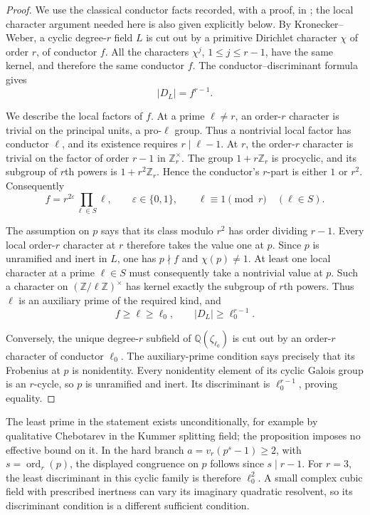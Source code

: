 \documentclass[11pt]{article}
\theoremstyle{definition}
\theoremstyle{remark}
\begin{document}
\begin{proof}
We use the classical conductor facts recorded, with a proof, in
\citet[Lemma~8.3.1]{CornelissenHokkenRingeling2026}; the local
character argument needed here is also given explicitly below.
By Kronecker--Weber, a cyclic degree-$r$ field $L$ is cut out by
a primitive Dirichlet character $\chi$ of order $r$, of conductor
$f$.  All the characters $\chi^j$, $1\le j\le r-1$, have the
same kernel, and therefore the same conductor $f$.  The
conductor--discriminant formula gives
\[
 |D_L|=f^{r-1}.
\]

We describe the local factors of $f$.  At a prime $\ell\ne r$,
an order-$r$ character is trivial on the principal units, a
pro-$\ell$ group.  Thus a nontrivial local factor has conductor
$\ell$, and its existence requires $r\mid\ell-1$.
At $r$, the order-$r$ character is trivial on the factor of
order $r-1$ in $\mathbb Z_r^\times$.  The group
$1+r\mathbb Z_r$ is procyclic, and its subgroup of $r$th powers
is $1+r^2\mathbb Z_r$.  Hence the conductor's $r$-part is either
$1$ or $r^2$.  Consequently
\[
 f=r^{2\varepsilon}\prod_{\ell\in S}\ell,
 \qquad \varepsilon\in\{0,1\},
 \qquad \ell\equiv1\pmod r\quad(\ell\in S).
\]

The assumption on $p$ says that its class modulo $r^2$ has
order dividing $r-1$.  Every local order-$r$ character at $r$
therefore takes the value one at $p$.
Since $p$ is unramified and inert in $L$, one has
$p\nmid f$ and $\chi(p)\ne1$.  At least one local character
at a prime $\ell\in S$ must consequently take a nontrivial
value at $p$.  Such a character on
$(\mathbb Z/\ell\mathbb Z)^\times$ has kernel exactly the
subgroup of $r$th powers.  Thus $\ell$ is an auxiliary prime
of the required kind, and
\[
 f\ge\ell\ge\ell_0,
 \qquad |D_L|\ge\ell_0^{r-1}.
\]

Conversely, the unique degree-$r$ subfield of
$\mathbb Q(\zeta_{\ell_0})$ is cut out by an order-$r$
character of conductor $\ell_0$.
The auxiliary-prime condition says precisely that its Frobenius
at $p$ is nonidentity.  Every nonidentity element of its cyclic
Galois group is an $r$-cycle, so $p$ is unramified and inert.
Its discriminant is $\ell_0^{r-1}$, proving equality.
\end{proof}

The least prime in the statement exists unconditionally, for
example by qualitative Chebotarev in the Kummer splitting field;
the proposition imposes no effective bound on it.  In the hard
branch $a=v_r(p^s-1)\ge2$, with $s=\operatorname{ord}_r(p)$,
the displayed congruence on $p$ follows since $s\mid r-1$.
For $r=3$, the least discriminant in this cyclic family is
therefore $\ell_0^2$.  A small complex cubic field with prescribed
inertness can vary its imaginary quadratic resolvent, so its
discriminant condition is a different sufficient condition.
\end{document}
